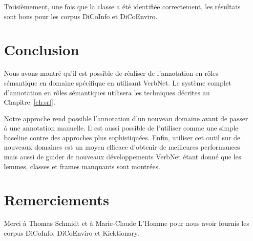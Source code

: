 Troisièmement, une fois que la classe a été identifiée correctement, les
résultats sont bons pour les corpus DiCoInfo et DiCoEnviro.

\section{Conclusion}

Nous avons montré qu'il est possible de réaliser de l'annotation en rôles
sémantique en domaine spécifique en utilisant VerbNet. Le système complet
d'annotation en rôles sémantiques utilisera les techniques décrites au
Chapitre~\ref{ch:srl}.

Notre approche rend possible l'annotation d'un nouveau domaine avant de passer
à une annotation manuelle. Il est aussi possible de l'utiliser comme une simple
baseline contre des approches plus sophistiquées. Enfin, utiliser cet outil sur
de nouveaux domaines est un moyen efficace d'obtenir de meilleures performances
mais aussi de guider de nouveaux développements VerbNet étant donné que les
lemmes, classes et frames manquants sont montrées.

\section*{Remerciements}

Merci à Thomas Schmidt et à Marie-Claude L'Homme pour nous avoir fournis les
corpus DiCoInfo, DiCoEnviro et Kicktionary.
